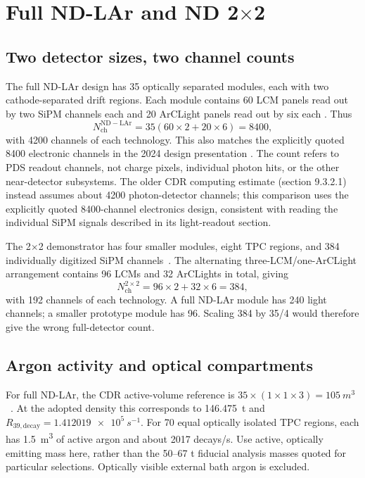 \section{Full ND-LAr and ND 2\texorpdfstring{$\times$}{x}2}
\label{sec:nd2x2}

\subsection{Two detector sizes, two channel counts}

The full ND-LAr design has 35 optically separated modules, each with two
cathode-separated drift regions. Each module contains 60 LCM panels read
out by two SiPM channels each and 20 ArCLight panels read out by six each
\cite{nd_cdr}. Thus
\begin{equation}
\boxed{N_{\mathrm{ch}}^{\mathrm{ND-LAr}}
=35(60\times2+20\times6)=8400,}
\end{equation}
with 4200 channels of each technology. This also matches the explicitly
quoted 8400 electronic channels in the 2024 design presentation
\cite{nd_channels}. The count refers to PDS readout channels, not charge
pixels, individual photon hits, or the other near-detector subsystems.
The older CDR computing estimate (section 9.3.2.1) instead assumes about
4200 photon-detector channels; this comparison uses the explicitly quoted
8400-channel electronics design, consistent with reading the individual
SiPM signals described in its light-readout section.

The 2$\times$2 demonstrator has four smaller modules, eight TPC regions,
and 384 individually digitized SiPM channels~\cite{nd_operation}.
The alternating three-LCM/one-ArCLight arrangement contains 96 LCMs
and 32 ArCLights in total, giving
\begin{equation}
\boxed{N_{\mathrm{ch}}^{2\times2}
=96\times2+32\times6=384,}
\end{equation}
with 192 channels of each technology. A full ND-LAr module has 240 light
channels; a smaller prototype module has 96. Scaling 384 by 35/4 would
therefore give the wrong full-detector count.

\subsection{Argon activity and optical compartments}

For full ND-LAr, the CDR active-volume reference is
$35\times(1\times1\times3)=\SI{105}{m^3}$~\cite{nd_cdr}. At the adopted
 density this corresponds to \SI{146.475}{t} and
$R_{39,\mathrm{decay}}=\SI{1.412019e5}{s^{-1}}$.
For 70 equal optically isolated TPC regions, each has \SI{1.5}{m^3} of
active argon and about 2017 decays/s. Use active, optically emitting mass
here, rather than the 50--67 t fiducial analysis masses quoted for particular
selections. Optically visible external bath argon is excluded.

